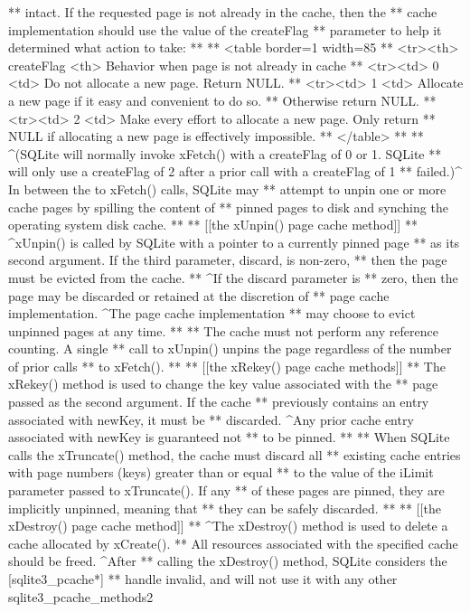\begin{Codex}[label=sqlite3.h,numbers=left]
{** intact.  If the requested page is not already in the cache, then the
** cache implementation should use the value of the createFlag
** parameter to help it determined what action to take:
**
** <table border=1 width=85%
** <tr><th> createFlag <th> Behavior when page is not already in cache
** <tr><td> 0 <td> Do not allocate a new page.  Return NULL.
** <tr><td> 1 <td> Allocate a new page if it easy and convenient to do so.
**                 Otherwise return NULL.
** <tr><td> 2 <td> Make every effort to allocate a new page.  Only return
**                 NULL if allocating a new page is effectively impossible.
** </table>
**
** ^(SQLite will normally invoke xFetch() with a createFlag of 0 or 1.  SQLite
** will only use a createFlag of 2 after a prior call with a createFlag of 1
** failed.)^  In between the to xFetch() calls, SQLite may
** attempt to unpin one or more cache pages by spilling the content of
** pinned pages to disk and synching the operating system disk cache.
**
** [[the xUnpin() page cache method]]
** ^xUnpin() is called by SQLite with a pointer to a currently pinned page
** as its second argument.  If the third parameter, discard, is non-zero,
** then the page must be evicted from the cache.
** ^If the discard parameter is
** zero, then the page may be discarded or retained at the discretion of
** page cache implementation. ^The page cache implementation
** may choose to evict unpinned pages at any time.
**
** The cache must not perform any reference counting. A single 
** call to xUnpin() unpins the page regardless of the number of prior calls 
** to xFetch().
**
** [[the xRekey() page cache methods]]
** The xRekey() method is used to change the key value associated with the
** page passed as the second argument. If the cache
** previously contains an entry associated with newKey, it must be
** discarded. ^Any prior cache entry associated with newKey is guaranteed not
** to be pinned.
**
** When SQLite calls the xTruncate() method, the cache must discard all
** existing cache entries with page numbers (keys) greater than or equal
** to the value of the iLimit parameter passed to xTruncate(). If any
** of these pages are pinned, they are implicitly unpinned, meaning that
** they can be safely discarded.
**
** [[the xDestroy() page cache method]]
** ^The xDestroy() method is used to delete a cache allocated by xCreate().
** All resources associated with the specified cache should be freed. ^After
** calling the xDestroy() method, SQLite considers the [sqlite3_pcache*]
** handle invalid, and will not use it with any other sqlite3_pcache_methods2
}
\end{Codex}
